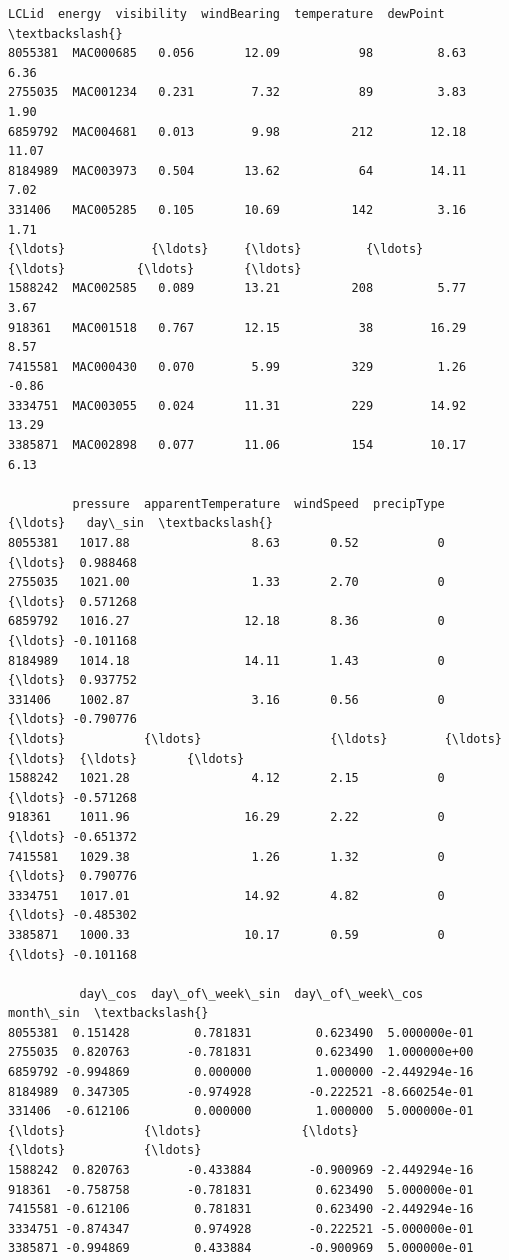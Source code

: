 \documentclass[11pt]{article}
\makeatletter
\newcommand{\boxspacing}{\kern\kvtcb@left@rule\kern\kvtcb@boxsep}
\newcommand{\prompt}[4]{
        {\ttfamily\llap{{\color{#2}[#3]:\hspace{3pt}#4}}\vspace{-\baselineskip}}
    }
\makeatother
\begin{document}
            \begin{tcolorbox}[breakable, size=fbox, boxrule=.5pt, pad at break*=1mm, opacityfill=0]
\prompt{Out}{outcolor}{283}{\boxspacing}
\begin{Verbatim}[commandchars=\\\{\}]
             LCLid  energy  visibility  windBearing  temperature  dewPoint  \textbackslash{}
8055381  MAC000685   0.056       12.09           98         8.63      6.36
2755035  MAC001234   0.231        7.32           89         3.83      1.90
6859792  MAC004681   0.013        9.98          212        12.18     11.07
8184989  MAC003973   0.504       13.62           64        14.11      7.02
331406   MAC005285   0.105       10.69          142         3.16      1.71
{\ldots}            {\ldots}     {\ldots}         {\ldots}          {\ldots}          {\ldots}       {\ldots}
1588242  MAC002585   0.089       13.21          208         5.77      3.67
918361   MAC001518   0.767       12.15           38        16.29      8.57
7415581  MAC000430   0.070        5.99          329         1.26     -0.86
3334751  MAC003055   0.024       11.31          229        14.92     13.29
3385871  MAC002898   0.077       11.06          154        10.17      6.13

         pressure  apparentTemperature  windSpeed  precipType  {\ldots}   day\_sin  \textbackslash{}
8055381   1017.88                 8.63       0.52           0  {\ldots}  0.988468
2755035   1021.00                 1.33       2.70           0  {\ldots}  0.571268
6859792   1016.27                12.18       8.36           0  {\ldots} -0.101168
8184989   1014.18                14.11       1.43           0  {\ldots}  0.937752
331406    1002.87                 3.16       0.56           0  {\ldots} -0.790776
{\ldots}           {\ldots}                  {\ldots}        {\ldots}         {\ldots}  {\ldots}       {\ldots}
1588242   1021.28                 4.12       2.15           0  {\ldots} -0.571268
918361    1011.96                16.29       2.22           0  {\ldots} -0.651372
7415581   1029.38                 1.26       1.32           0  {\ldots}  0.790776
3334751   1017.01                14.92       4.82           0  {\ldots} -0.485302
3385871   1000.33                10.17       0.59           0  {\ldots} -0.101168

          day\_cos  day\_of\_week\_sin  day\_of\_week\_cos     month\_sin  \textbackslash{}
8055381  0.151428         0.781831         0.623490  5.000000e-01
2755035  0.820763        -0.781831         0.623490  1.000000e+00
6859792 -0.994869         0.000000         1.000000 -2.449294e-16
8184989  0.347305        -0.974928        -0.222521 -8.660254e-01
331406  -0.612106         0.000000         1.000000  5.000000e-01
{\ldots}           {\ldots}              {\ldots}              {\ldots}           {\ldots}
1588242  0.820763        -0.433884        -0.900969 -2.449294e-16
918361  -0.758758        -0.781831         0.623490  5.000000e-01
7415581 -0.612106         0.781831         0.623490 -2.449294e-16
3334751 -0.874347         0.974928        -0.222521 -5.000000e-01
3385871 -0.994869         0.433884        -0.900969  5.000000e-01


\end{Verbatim}
\end{tcolorbox}
\end{document}
